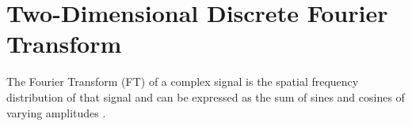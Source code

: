 \section{Two-Dimensional Discrete Fourier Transform}


The Fourier Transform (FT) of a complex signal is the spatial frequency distribution of that signal and can be expressed as the sum of sines and cosines of varying amplitudes \cite{Wahl1987}.

